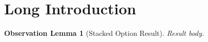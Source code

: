 \section[Short Intro]{Long Introduction}
\newtheorem{oblemma}{Observation Lemma}[section]
\begin{oblemma}[Stacked Option Result]\label{obs:main}
Result body.
\end{oblemma}
